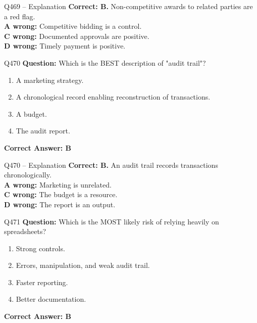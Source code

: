 \documentclass[aspectratio=169,10pt]{beamer}
\begin{document}
	\begin{frame}[t]{Q469 -- Explanation}
		\small
		\textbf{Correct: B.} Non-competitive awards to related parties are a red flag. \\[4pt]
		\textbf{A wrong:} Competitive bidding is a control. \\[2pt]
		\textbf{C wrong:} Documented approvals are positive. \\[2pt]
		\textbf{D wrong:} Timely payment is positive.
	\end{frame}
	
	\begin{frame}[t]{Q470}
		\small
		\textbf{Question:} Which is the BEST description of "audit trail"?
		\begin{enumerate}[label=\Alph*.,itemsep=1pt,topsep=2pt]
			\item A marketing strategy.
			\item A chronological record enabling reconstruction of transactions.
			\item A budget.
			\item The audit report.
		\end{enumerate}
		\vspace{4pt}
		\textbf{Correct Answer: B}
	\end{frame}
	
	\begin{frame}[t]{Q470 -- Explanation}
		\small
		\textbf{Correct: B.} An audit trail records transactions chronologically. \\[4pt]
		\textbf{A wrong:} Marketing is unrelated. \\[2pt]
		\textbf{C wrong:} The budget is a resource. \\[2pt]
		\textbf{D wrong:} The report is an output.
	\end{frame}
	
	\begin{frame}[t]{Q471}
		\small
		\textbf{Question:} Which is the MOST likely risk of relying heavily on spreadsheets?
		\begin{enumerate}[label=\Alph*.,itemsep=1pt,topsep=2pt]
			\item Strong controls.
			\item Errors, manipulation, and weak audit trail.
			\item Faster reporting.
			\item Better documentation.
		\end{enumerate}
		\vspace{4pt}
		\textbf{Correct Answer: B}
	\end{frame}
	
\end{document}
